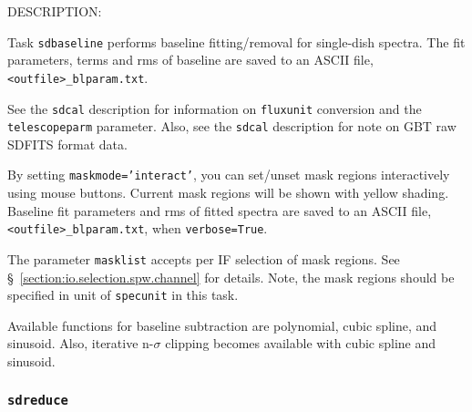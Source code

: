 DESCRIPTION:

Task {\tt sdbaseline} performs baseline fitting/removal for single-dish spectra.
The fit parameters, terms and rms of baseline are saved to an ASCII
file, {\tt <outfile>\_blparam.txt}.

See the {\tt sdcal} description for information on {\tt fluxunit} 
conversion and the {\tt telescopeparm} parameter.
Also, see the {\tt sdcal} description for note on GBT raw SDFITS format data.

By setting {\tt maskmode='interact'}, you can set/unset mask regions interactively using
mouse buttons. Current mask regions will be shown with yellow shading.
Baseline fit parameters and rms of fitted spectra are saved to an
ASCII file, {\tt <outfile>\_blparam.txt}, when {\tt verbose=True}.

The parameter {\tt masklist} accepts per IF selection of mask regions. 
See \S~\ref{section:io.selection.spw.channel} for details. 
Note, the mask regions should be specified in unit of {\tt specunit} 
in this task.

Available functions for baseline subtraction are polynomial, cubic spline, and sinusoid. 
Also, iterative n-$\sigma$ clipping becomes available with cubic spline and sinusoid. 


  
\subsubsection{{\tt sdreduce}}
\label{section:sd.sdtasks.tasks.sdreduce}

